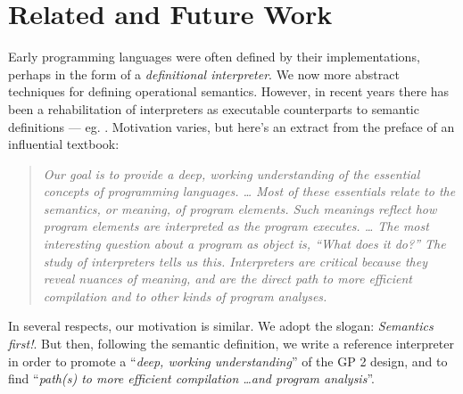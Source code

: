 \section{Related and Future Work}
\label{sec:relatedandfuture}
Early programming languages were often defined by their implementations,
perhaps in the form of a \emph{definitional interpreter}.
We now more abstract techniques for defining operational semantics.
However, in recent years there has been a 
rehabilitation of interpreters as executable counterparts to semantic
definitions --- eg. \cite{Campbell2012}. 
Motivation varies, but here's an extract from the preface
of an influential textbook: 
\begin{quote}
\textit{Our goal is to provide a deep, working understanding of the essential concepts of programming languages. \ldots
Most of these essentials relate to the semantics, or meaning, of program elements. Such meanings reflect how program elements are interpreted as the program executes. \ldots
The most interesting question about a program as object is, \textnormal{``What does it do?''} The study of interpreters tells us this. Interpreters are critical because they reveal nuances of meaning, and are the direct path to more efficient compilation and to other kinds of program analyses.} \cite{Friedmanetal2008}
\end{quote}
In several respects, our motivation is similar.
We adopt the slogan: \emph{Semantics first!}.
But then, following the semantic definition, we write a reference interpreter in order to
promote a ``\textit{deep, working understanding}'' of the GP 2 design,
and to find ``\textit{path(s) to more efficient compilation \ldots and program analysis}''.


